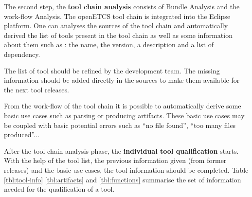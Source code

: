 


The second step, the {\bf tool chain analysis} consists of Bundle Analysis
and the work-flow Analysis.
The openETCS tool chain is integrated into the Eclipse platform. One
can analyses the sources of the tool chain and automatically derived
the list of tools present in the tool chain as well as some
information about them such as :  the name,  the version,
a description and a list of dependency.

The list of tool should be refined by the development team.
The missing information should be added directly in the
sources to make them available for the next tool releases.


From the work-flow of the tool chain it is possible to automatically
derive some basic use cases such as parsing or producing
artifacts. These basic use cases may be coupled with basic potential
errors such as ``no file found'', ``too many files produced''...

After the tool chain analysis phase, the {\bf individual tool qualification}
starts. With the help of the tool list, the previous information given
(from former releases) and the basic use cases, the tool information
should be completed. Table \ref{tbl:tool-info} \ref{tbl:artifacts} and
\ref{tbl:functions} summarise the set of information needed for the
qualification of a tool.

